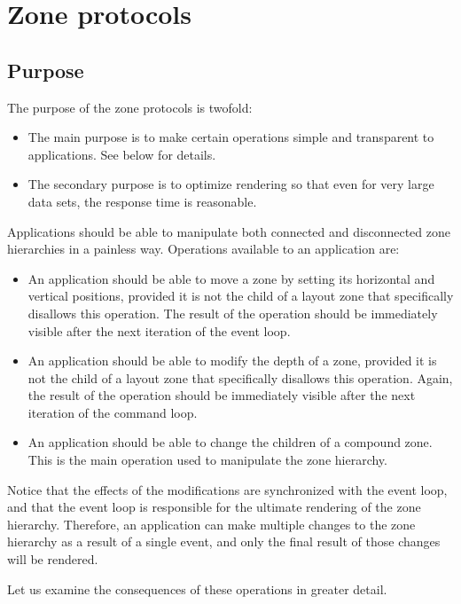 \documentclass{report}
\begin{document}
\chapter{Zone protocols}

\section{Purpose}

The purpose of the zone protocols is twofold:

\begin{itemize}
\item The main purpose is to make certain operations simple and
  transparent to applications.  See below for details.
\item The secondary purpose is to optimize rendering so that even for
  very large data sets, the response time is reasonable.
\end{itemize}

Applications should be able to manipulate both connected and
disconnected zone hierarchies in a painless way.  Operations available
to an application are:

\begin{itemize}
\item An application should be able to move a zone by setting its
  horizontal and vertical positions, provided it is not the child of a
  layout zone that specifically disallows this operation.  The result
  of the operation should be immediately visible after the next
  iteration of the event loop.
\item An application should be able to modify the depth of a zone,
  provided it is not the child of a layout zone that specifically
  disallows this operation.  Again, the result of the operation should
  be immediately visible after the next iteration of the command
  loop. 
\item An application should be able to change the children of a
  compound zone.  This is the main operation used to manipulate the
  zone hierarchy.  
\end{itemize}

Notice that the effects of the modifications are synchronized with the
event loop, and that the event loop is responsible for the ultimate
rendering of the zone hierarchy.  Therefore, an application can make
multiple changes to the zone hierarchy as a result of a single event,
and only the final result of those changes will be rendered.  

Let us examine the consequences of these operations in greater
detail. 
\end{document}
